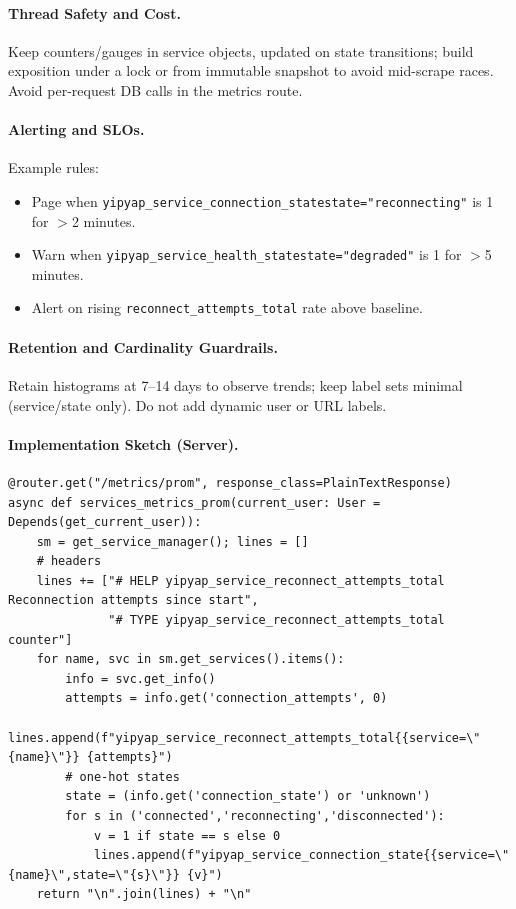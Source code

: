 \documentclass[11pt]{article}
\begin{document}
\paragraph{Thread Safety and Cost.} Keep counters/gauges in service objects, updated on state transitions; build exposition under a lock or from immutable snapshot to avoid mid-scrape races. Avoid per-request DB calls in the metrics route.

\paragraph{Alerting and SLOs.} Example rules:
\begin{itemize}[nosep]
  \item Page when \texttt{yipyap\_service\_connection\_state{state="reconnecting"}} is 1 for \(>\)2 minutes.
  \item Warn when \texttt{yipyap\_service\_health\_state{state="degraded"}} is 1 for \(>\)5 minutes.
  \item Alert on rising \texttt{reconnect\_attempts\_total} rate above baseline.
\end{itemize}

\paragraph{Retention and Cardinality Guardrails.} Retain histograms at 7–14 days to observe trends; keep label sets minimal (service/state only). Do not add dynamic user or URL labels.

\paragraph{Implementation Sketch (Server).}
\begin{verbatim}
@router.get("/metrics/prom", response_class=PlainTextResponse)
async def services_metrics_prom(current_user: User = Depends(get_current_user)):
    sm = get_service_manager(); lines = []
    # headers
    lines += ["# HELP yipyap_service_reconnect_attempts_total Reconnection attempts since start",
              "# TYPE yipyap_service_reconnect_attempts_total counter"]
    for name, svc in sm.get_services().items():
        info = svc.get_info()
        attempts = info.get('connection_attempts', 0)
        lines.append(f"yipyap_service_reconnect_attempts_total{{service=\"{name}\"}} {attempts}")
        # one-hot states
        state = (info.get('connection_state') or 'unknown')
        for s in ('connected','reconnecting','disconnected'):
            v = 1 if state == s else 0
            lines.append(f"yipyap_service_connection_state{{service=\"{name}\",state=\"{s}\"}} {v}")
    return "\n".join(lines) + "\n"
\end{verbatim}
\end{document}
